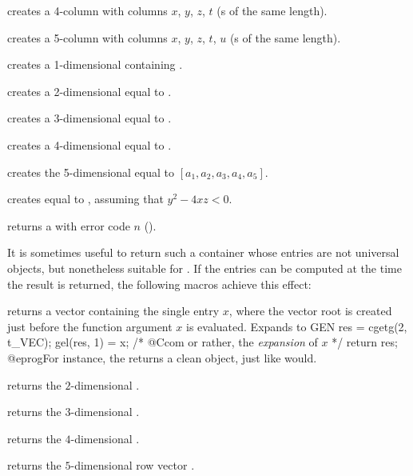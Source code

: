  creates a 4-column 
with columns $x$, $y$, $z$, $t$ (s of the same length).

 creates a 5-column
 with columns $x$, $y$, $z$, $t$, $u$ (s of the same
length).

 creates a 1-dimensional  containing .

 creates a 2-dimensional  equal to
\kbd{[x,y]}.

 creates a 3-dimensional 
equal to \kbd{[x,y,z]}.

 creates a 4-dimensional 
equal to \kbd{[x,y,z,t]}.

 creates the
5-dimensional  equal to $[a_1,a_2,a_3,a_4,a_5]$.

 creates  equal
to , assuming that $y^2 - 4xz < 0$.

 returns a  with error code $n$
().

\smallskip

It is sometimes useful to return such a container whose entries are not
universal objects, but nonetheless suitable for .
If the entries can be computed at the time the result is returned, the
following macros achieve this effect:

 returns a vector containing the single entry $x$,
where the vector root is created just before the function argument $x$ is
evaluated. Expands to
\bprog
  {
    GEN res = cgetg(2, t_VEC);
    gel(res, 1) = x; /* @Ccom or rather, the \emph{expansion} of $x$ */
    return res;
  }
@eprog\noindent For instance, the  returns a clean
object, just like  would.

returns the $2$-dimensional  \kbd{[x,y]}.

returns the $3$-dimensional  \kbd{[x,y,z]}.

returns the $4$-dimensional  \kbd{[x,y,z,t]}.

returns the $5$-dimensional row vector \kbd{[x,y,z,t,u]}.

